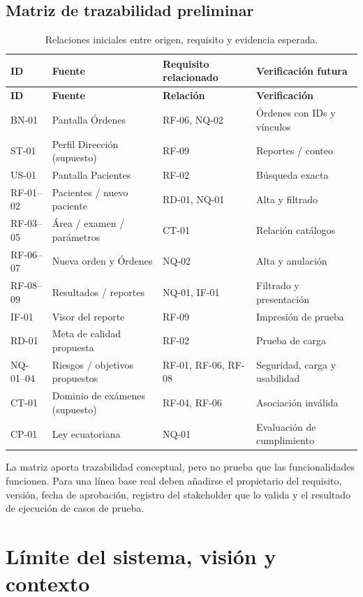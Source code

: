 \subsection{Matriz de trazabilidad preliminar}
\begingroup\small
\begin{longtable}{@{}p{1.5cm}p{3.2cm}p{4.2cm}p{3.5cm}@{}}
\caption{Relaciones iniciales entre origen, requisito y evidencia esperada.}\label{tab:traza}\\\toprule
\textbf{ID} & \textbf{Fuente} & \textbf{Requisito relacionado} & \textbf{Verificación futura}\\\midrule\endfirsthead\toprule\textbf{ID} & \textbf{Fuente} & \textbf{Relación} & \textbf{Verificación}\\\midrule\endhead
BN-01 & Pantalla Órdenes & RF-06, NQ-02 & Órdenes con IDs y vínculos\\
ST-01 & Perfil Dirección (supuesto) & RF-09 & Reportes / conteo\\
US-01 & Pantalla Pacientes & RF-02 & Búsqueda exacta\\
RF-01--02 & Pacientes / nuevo paciente & RD-01, NQ-01 & Alta y filtrado\\
RF-03--05 & Área / examen / parámetros & CT-01 & Relación catálogos\\
RF-06--07 & Nueva orden y Órdenes & NQ-02 & Alta y anulación\\
RF-08--09 & Resultados / reportes & NQ-01, IF-01 & Filtrado y presentación\\
IF-01 & Visor del reporte & RF-09 & Impresión de prueba\\
RD-01 & Meta de calidad propuesta & RF-02 & Prueba de carga\\
NQ-01--04 & Riesgos / objetivos propuestos & RF-01, RF-06, RF-08 & Seguridad, carga y usabilidad\\
CT-01 & Dominio de exámenes (supuesto) & RF-04, RF-06 & Asociación inválida\\
CP-01 & Ley ecuatoriana & NQ-01 & Evaluación de cumplimiento\\\bottomrule
\end{longtable}\endgroup

La matriz aporta trazabilidad conceptual, pero no prueba que las funcionalidades funcionen. Para una línea base real deben añadirse el propietario del requisito, versión, fecha de aprobación, registro del stakeholder que lo valida y el resultado de ejecución de casos de prueba.


\clearpage
\section{Límite del sistema, visión y contexto}

